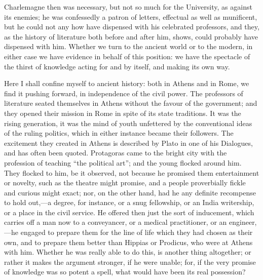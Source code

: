 Charlemagne then was necessary, but not so much for the University,
as against its enemies; he was confessedly a patron of letters,
effectual as well as munificent, but he could not any how have
dispensed with his celebrated professors, and they, as the history of
literature both before and after him, shows, could probably have
dispensed with him. Whether we turn to the ancient world or to the
modern, in either case we have evidence in behalf of this position: we
have the spectacle of the thirst of knowledge acting for and by
itself, and making its own way.

Here I shall confine myself to ancient history: both in Athens and
in Rome, we find it pushing forward, in independence of the civil
power. The professors of literature seated themselves in Athens
without the favour of the government; and they opened their mission in
Rome in spite of its state traditions. It was the rising generation,
it was the mind of youth unfettered by the conventional ideas of the
ruling politics, which in either instance became their followers. The
excitement they created in Athens is described by Plato in one of
his Dialogues, and has often been quoted. Protagoras came to the
bright city with the profession of teaching ``the political
art''; and the young flocked around him. They flocked to him, be
it observed, not because he promised them entertainment or novelty,
such as the theatre might promise, and a people proverbially fickle
and curious might exact; nor, on the other hand, had he any definite
recompense to hold out,—a degree, for instance, or a snug
fellowship, or an India writership, or a place in the civil service.
He offered then just the sort of inducement, which carries off a man
now to a conveyancer, or a medical practitioner, or an engineer,—he
engaged to prepare them for the line of life which they had chosen as
their own, and to prepare them better than Hippias or Prodicus, who
were at Athens with him. Whether he was really able to do this, is
another thing altogether; or rather it makes the argument stronger, if
he were unable; for, if the very promise of knowledge was so potent a
spell, what would have been its real possession?

